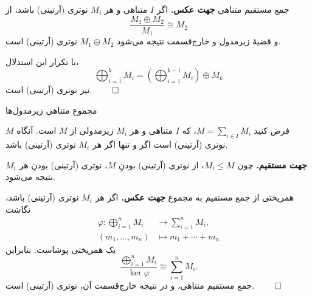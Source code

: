 \begin{frame}[t]{جمع مستقیم متناهی}
    \label{lec11:direct-sum-finite}
    \textbf{جهت عکس.}
    اگر $I$ متناهی و هر $M_i$ نوتری \textup{(آرتینی)} باشد، از
    \[
        \frac{M_1\oplus M_2}{M_1}\cong M_2
    \]
    و قضیهٔ زیرمدول و خارج‌قسمت نتیجه می‌شود $M_1\oplus M_2$
    نوتری \textup{(آرتینی)} است.

    با تکرار این استدلال،
    \[
        \bigoplus_{i=1}^{k}M_i
        =\left(\bigoplus_{i=1}^{k-1}M_i\right)\oplus M_k
    \]
    نیز نوتری \textup{(آرتینی)} است.
    \hfill\(\qed\)
\end{frame}

\begin{frame}[t]{مجموع متناهی زیرمدول‌ها}
    \label{lec11:finite-sum-criterion}
    \begin{theorem}
        فرض کنید $M=\sum_{i\in I}M_i$، که $I$ متناهی و هر $M_i$
        زیرمدولی از $M$ است. آنگاه $M$ نوتری \textup{(آرتینی)} است
        اگر و تنها اگر هر $M_i$ نوتری \textup{(آرتینی)} باشد.
    \end{theorem}
    \textbf{جهت مستقیم.}
    چون $M_i\leqslant M$، از نوتری \textup{(آرتینی)} بودنِ $M$،
    نوتری \textup{(آرتینی)} بودنِ هر $M_i$ نتیجه می‌شود.
\end{frame}

\begin{frame}[t]{همریختی از جمع مستقیم به مجموع}
    \label{lec11:finite-sum-epimorphism}
    \textbf{جهت عکس.}
    اگر هر $M_i$ نوتری \textup{(آرتینی)} باشد، نگاشت
    \[
        \begin{aligned}
            \varphi:\bigoplus_{i=1}^{n}M_i&\longrightarrow\sum_{i=1}^{n}M_i,\\
            (m_1,\ldots,m_n)&\longmapsto m_1+\cdots+m_n
        \end{aligned}
    \]
    یک همریختی پوشاست. بنابراین
    \[
        \frac{\bigoplus_{i=1}^{n}M_i}{\ker\varphi}
        \cong\sum_{i=1}^{n}M_i.
    \]
    جمع مستقیم متناهی، و در نتیجه خارج‌قسمت آن، نوتری \textup{(آرتینی)} است.
    \hfill\(\qed\)
\end{frame}

